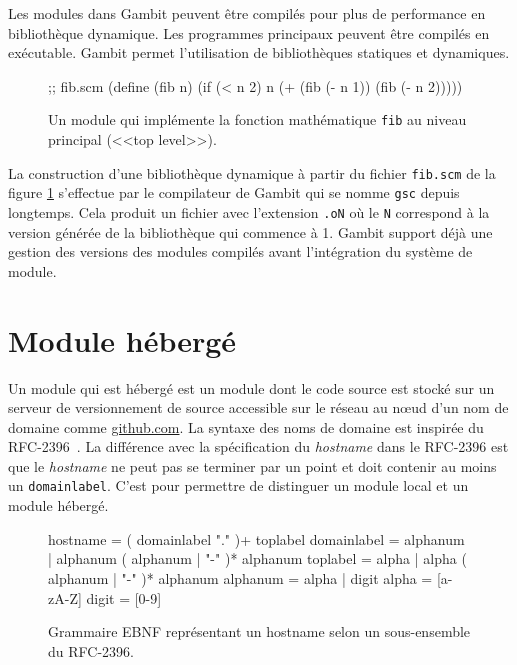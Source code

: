 Les modules dans Gambit peuvent être compilés pour plus de performance en
bibliothèque dynamique. Les programmes principaux peuvent être compilés en
exécutable.  Gambit permet l'utilisation de bibliothèques statiques et
dynamiques.\\

\begin{figure}[ht]
  \centering

  \begin{mplisting}{0.5}
;; fib.scm
(define (fib n)
  (if (< n 2)
      n
      (+ (fib (- n 1))
         (fib (- n 2)))))
\end{mplisting}
  \caption{Un module qui implémente la fonction mathématique \texttt{fib}
    au niveau principal (<<top level>>).}
  \label{fig:basic_fib_module}
\end{figure}

La construction d'une bibliothèque dynamique à partir du fichier
\texttt{fib.scm} de la figure \ref{fig:basic_fib_module} s'effectue par le
compilateur de Gambit qui se nomme \texttt{gsc} depuis longtemps. Cela produit
un fichier avec l'extension \texttt{.oN} où le \texttt{N} correspond à la
version générée de la bibliothèque qui commence à 1. Gambit support
déjà une gestion des versions des modules compilés avant l'intégration
du système de module.


\section{Module hébergé}

Un module qui est hébergé est un module dont le code source est stocké sur un
serveur de versionnement de source accessible sur le réseau au nœud d'un nom
de domaine comme \url{github.com}. La syntaxe des noms de domaine est inspirée
du RFC-2396~\cite{RFC:URI-2396}.  La différence avec la spécification du
\textit{hostname} dans le RFC-2396 est que le \textit{hostname} ne peut pas se
terminer par un point et doit contenir au moins un \verb|domainlabel|. C'est
pour permettre de distinguer un module local et un module hébergé. \\

\begin{figure}[ht]
  \centering
  \lstset{frame=single}
  \begin{mplisting}{0.9}
hostname      = ( domainlabel "." )+ toplabel
domainlabel   = alphanum | alphanum ( alphanum | "-" )* alphanum
toplabel      = alpha | alpha ( alphanum | "-" )* alphanum
alphanum      = alpha | digit
alpha         = [a-zA-Z]
digit         = [0-9]
\end{mplisting}
  \caption{Grammaire EBNF représentant un hostname selon un sous-ensemble du
  RFC-2396.}
  \label{fig:hostname->grammar}
\end{figure}


